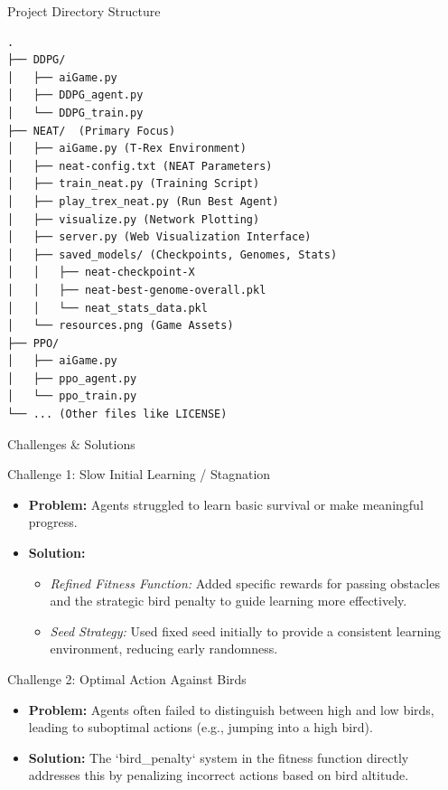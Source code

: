 \documentclass{beamer}
\begin{document}
\begin{frame}[fragile]{Project Directory Structure}
  \begin{tiny} %
    \begin{verbatim}
.
├── DDPG/
│   ├── aiGame.py
│   ├── DDPG_agent.py
│   └── DDPG_train.py
├── NEAT/  (Primary Focus)
│   ├── aiGame.py (T-Rex Environment)
│   ├── neat-config.txt (NEAT Parameters)
│   ├── train_neat.py (Training Script)
│   ├── play_trex_neat.py (Run Best Agent)
│   ├── visualize.py (Network Plotting)
│   ├── server.py (Web Visualization Interface)
│   ├── saved_models/ (Checkpoints, Genomes, Stats)
│   │   ├── neat-checkpoint-X
│   │   ├── neat-best-genome-overall.pkl
│   │   └── neat_stats_data.pkl
│   └── resources.png (Game Assets)
├── PPO/
│   ├── aiGame.py
│   ├── ppo_agent.py
│   └── ppo_train.py
└── ... (Other files like LICENSE)
    \end{verbatim}
  \end{tiny}
\end{frame}

\begin{frame}{Challenges \& Solutions}
    \begin{block}{Challenge 1: Slow Initial Learning / Stagnation}
        \begin{itemize}
            \item \textbf{Problem:} Agents struggled to learn basic survival or make meaningful progress.
            \item \textbf{Solution:}
                \begin{itemize}
                    \item \textit{Refined Fitness Function:} Added specific rewards for passing obstacles and the strategic bird penalty to guide learning more effectively.
                    \item \textit{Seed Strategy:} Used fixed seed initially to provide a consistent learning environment, reducing early randomness.
                \end{itemize}
        \end{itemize}
    \end{block}
    \pause
    \begin{block}{Challenge 2: Optimal Action Against Birds}
        \begin{itemize}
            \item \textbf{Problem:} Agents often failed to distinguish between high and low birds, leading to suboptimal actions (e.g., jumping into a high bird).
            \item \textbf{Solution:} The `bird\_penalty` system in the fitness function directly addresses this by penalizing incorrect actions based on bird altitude.
        \end{itemize}
    \end{block}
\end{frame}
\end{document}

